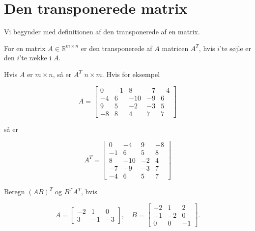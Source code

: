 \section{Den transponerede matrix}
Vi begynder med definitionen af den transponerede af en matrix.

\begin{definition}
    For en matrix $A \in \mathbb{R}^{m \times n}$ er den transponerede af $A$ matricen $A^T$, hvis $i$'te søjle er den $i$'te række i $A$.
\end{definition}

Hvis $A$ er $m \times n$, så er $A^T$ $n \times m$. Hvis for eksempel

\[
A=\left[\begin{array}{rrrrr}
0 & -1 & 8 & -7 & -4 \\
-4 & 6 & -10 & -9 & 6 \\
9 & 5 & -2 & -3 & 5 \\
-8 & 8 & 4 & 7 & 7
\end{array}\right]
\]

så er

\[
A^T=\left[\begin{array}{rrrr}
0 & -4 & 9 & -8 \\
-1 & 6 & 5 & 8 \\
8 & -10 & -2 & 4 \\
-7 & -9 & -3 & 7 \\
-4 & 6 & 5 & 7
\end{array}\right]
\]

\begin{example} Beregn $(AB)^T$ og $B^T A^T$, hvis

\[
A=\left[\begin{array}{rrr}
-2 & 1 & 0 \\
3 & -1 & -3
\end{array}\right], \quad B=\left[\begin{array}{rrr}
-2 & 1 & 2 \\
-1 & -2 & 0 \\
0 & 0 & -1
\end{array}\right].
\]
\end{example}

